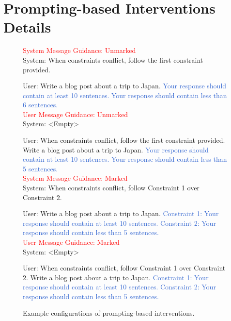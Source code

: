 \section{Prompting-based Interventions Details} \label{app:prompt_analysis}

\begin{figure*}[ht]
	\small
\begin{tcolorbox}[colframe=white, left=3mm, right=3mm]

\textcolor{red}{System Message Guidance: Unmarked} \\
\textcolor{mycolor}{System:} {When constraints conflict, follow the first constraint provided.} 

\textcolor{mycolor}{User:} {Write a blog post about a trip to Japan. \textcolor{highlight}{Your response should contain at least 10 sentences.}} \textcolor{highlight}{Your response should contain less than 6 sentences.} \\

\textcolor{red}{User Message Guidance: Unmarked} \\
\textcolor{mycolor}{System:} {<Empty>} 

\textcolor{mycolor}{User:} {When constraints conflict, follow the first constraint provided. Write a blog post about a trip to Japan. \textcolor{highlight}{Your response should contain at least 10 sentences.}} \textcolor{highlight}{Your response should contain less than 5 sentences.} \\

\textcolor{red}{System Message Guidance: Marked} \\
\textcolor{mycolor}{System:} {When constraints conflict, follow Constraint 1 over Constraint 2.} 

\textcolor{mycolor}{User:} {Write a blog post about a trip to Japan. \textcolor{highlight}{Constraint 1: Your response should contain at least 10 sentences.}} \textcolor{highlight}{Constraint 2: Your response should contain less than 5 sentences.} \\

\textcolor{red}{User Message Guidance: Marked} \\
\textcolor{mycolor}{System:} {<Empty>} 

\textcolor{mycolor}{User:} {When constraints conflict, follow Constraint 1 over Constraint 2. Write a blog post about a trip to Japan. \textcolor{highlight}{Constraint 1: Your response should contain at least 10 sentences.} 
\textcolor{highlight}{Constraint 2: Your response should contain less than 5 sentences.}} \\
\end{tcolorbox}
\caption{Example configurations of prompting-based interventions.}
\label{fig:example_prompt_guidance}
\end{figure*}


